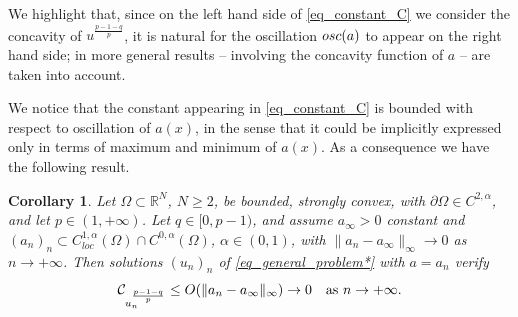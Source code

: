 \documentclass[11pt, reqno]{amsart}
\newtheorem{corollary}[lemma]{Corollary}
\theoremstyle{definition}
\numberwithin{equation}{section}
\newcommand{\R}{\mathbb{R}}
\newcommand{\mc}[1]{\mathcal{#1}}
\newcommand{\osc}{{\rm osc}}
\def\norm#1{\|#1\|}
\begin{document}
We highlight that, since on the left hand side of \eqref{eq_constant_C} we consider the concavity of $u^{\frac{p-1-q}{p}}$, it is natural for the oscillation $\osc(a)$ to appear on the right hand side; in \cite{GMrS25} more general results -- involving the concavity function of $a$ -- are taken into account.

We notice that the constant appearing in \eqref{eq_constant_C} is bounded with respect to oscillation of $a(x)$, in the sense that it could be implicitly expressed only in terms of maximum and minimum of $a(x)$. 
As a consequence we have the following result.

\begin{corollary}
\label{cor_conv_oscul}
Let $\Omega \subset \R^N$, $N\geq 2$, be bounded, strongly convex, with $\partial \Omega \in C^{2,\alpha}$, and let $p\in (1,+\infty)$.
Let $q \in [0,p-1)$, and assume $a_{\infty}>0$ constant and $(a_n)_n \subset C^{1,\alpha}_{loc}(\Omega)\cap C^{0,\alpha}(\Omega)$, $\alpha \in (0,1)$, with $\norm{a_n - a_{\infty}}_{\infty}\to 0$ as $n \to +\infty$. 
Then solutions $(u_n)_n$ of \eqref{eq_general_problem*} with $a=a_n$ verify
 $$ \mc{C}_{u_n^{ \frac{p-1 - q}{p}}} \leq O(\norm{a_n - a_{\infty}}_{\infty}) \to 0 \quad \hbox{as $n\to +\infty$}.$$
\end{corollary}
\end{document}
